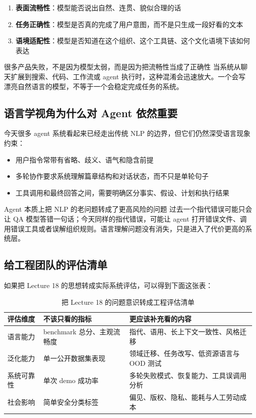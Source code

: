 \documentclass[a4paper]{article}
\begin{document}
\begin{enumerate}
    \item \textbf{表面流畅性}：模型能否说出自然、连贯、貌似合理的话
    \item \textbf{任务正确性}：模型是否真的完成了用户意图，而不是只生成一段好看的文本
    \item \textbf{语境适配性}：模型是否知道在这个组织、这个工具链、这个文化语境下该如何表达
\end{enumerate}

\begin{warningbox}{很多产品失败，不是因为模型太弱，而是因为把流畅性当成了正确性}
当系统从聊天扩展到搜索、代码、工作流或 agent 执行时，这种混淆会迅速放大。一个会写漂亮自然语言的模型，不等于一个会稳定完成任务的系统。
\end{warningbox}

\subsection{语言学视角为什么对 Agent 依然重要}

今天很多 agent 系统看起来已经走出传统 NLP 的边界，但它们仍然深受语言现象约束：

\begin{itemize}
    \item 用户指令常带有省略、歧义、语气和隐含前提
    \item 多轮协作要求系统理解篇章结构和对话状态，而不只是单轮句子
    \item 工具调用和最终回答之间，需要明确区分事实、假设、计划和执行结果
\end{itemize}

\begin{knowledgebox}{Agent 本质上把 NLP 的老问题转成了更高风险的问题}
过去一个指代错误可能只会让 QA 模型答错一句话；今天同样的指代错误，可能让 agent 打开错误文件、调用错误工具或者误解组织规则。语言理解问题没有消失，只是进入了代价更高的系统层。
\end{knowledgebox}

\subsection{给工程团队的评估清单}

如果把 Lecture 18 的思想转成实际系统评估，可以得到下面这张表：

\begin{table}[H]
\centering
\begin{tabular}{p{} p{} p{}}
\toprule
评估维度 & 不该只看的指标 & 更应该补充看的内容 \\
\midrule
语言能力 & benchmark 总分、主观流畅度 & 指代、语用、长上下文一致性、风格迁移 \\
泛化能力 & 单一公开数据集表现 & 领域迁移、任务改写、低资源语言与 OOD 测试 \\
系统可靠性 & 单次 demo 成功率 & 多轮失败模式、恢复能力、工具误调用分析 \\
社会影响 & 简单安全分类标签 & 偏见、版权、隐私、能耗与人工劳动成本 \\
\bottomrule
\end{tabular}
\caption{把 Lecture 18 的问题意识转成工程评估清单}
\end{table}
\end{document}
